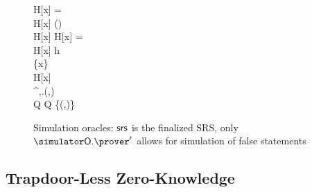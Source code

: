 

\begin{figure}
	\centering
		\begin{pcvstack}
		\begin{pchstack}
			{
			\pcif H[x] = \bot \pcthen \\
			\pcind H[x] \sample {}(\ro) \\
			\pcreturn H[x]
			  }
			\pchspace
			{ 
				\pcif H[x] = \bot \pcthen \\ 
				\pcind H[x] \gets h \\
				\pcind \Qprog \gets \Qprog \cup \{x\}\\
				\pcreturn H[x]
			}
			\pchspace
			{ 
				\boxed{\pcassert (\inp,\wit)\in \REL} \\ 
				\pi \gets \simulator^{\simOH,\simulator\oracleo.\prog}(\srs,\inp)\\
				Q \gets Q \cup \{(\inp,\pi)\}\\
				\pcreturn \pi
			}
		\end{pchstack}
	\end{pcvstack}
	\caption{Simulation oracles: $\mathsf{srs}$ is the finalized SRS, only $\simOP'$ allows for simulation of false statements}
	\label{fig:real_simulator_oracles}
\end{figure}

\subsection{Trapdoor-Less Zero-Knowledge}







